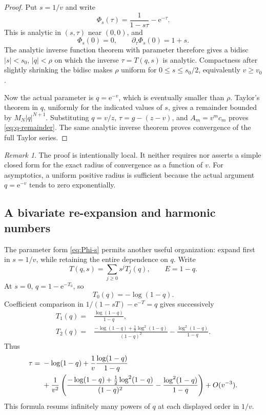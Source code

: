 \documentclass[11pt,oneside]{article}
\theoremstyle{plain}
\theoremstyle{definition}
\theoremstyle{remark}
\newtheorem{remark}[theorem]{Remark}
\newcommand{\e}{\mathrm{e}}
\begin{document}
\begin{proof}
Put \(s=1/v\) and write
\begin{equation}
 \Phi_s(\tau)=\frac1{1-s\tau}-\e^{-\tau}.
 \label{eq:Phi-s}
\end{equation}
This is analytic in \((s,\tau)\) near \((0,0)\), and
\[
 \Phi_s(0)=0,
 \qquad
 \partial_{\tau}\Phi_s(0)=1+s.
\]
The analytic inverse function theorem with parameter therefore gives a
bidisc \(|s|<s_0\), \(|q|<\rho\) on which the inverse \(\tau=T(q,s)\) is
analytic.  Compactness after slightly shrinking the bidisc makes \(\rho\)
uniform for \(0\le s\le s_0/2\), equivalently \(v\ge v_0\).

Now the actual parameter is \(q=\e^{-v}\), which is eventually smaller than
\(\rho\).  Taylor's theorem in \(q\), uniformly for the indicated values of
\(s\), gives a remainder bounded by \(M_N|q|^{N+1}\).  Substituting
\(q=v/z\), \(\tau=g-(z-v)\), and \(A_m=v^mc_m\) proves
\eqref{eq:q-remainder}.  The same analytic inverse theorem proves convergence
of the full Taylor series.
\end{proof}

\begin{remark}
The proof is intentionally local.  It neither requires nor asserts a simple
closed form for the exact radius of convergence as a function of \(v\).  For
asymptotics, a uniform positive radius is sufficient because the actual
argument \(q=\e^{-v}\) tends to zero exponentially.
\end{remark}

\subsection{A bivariate re-expansion and harmonic numbers}

The parameter form \eqref{eq:Phi-s} permits another useful organization:
expand first in \(s=1/v\), while retaining the entire dependence on
\(q\).  Write
\begin{equation}
 T(q,s)=\sum_{j\ge0}s^jT_j(q),
 \qquad E=1-q.
 \label{eq:Tjs}
\end{equation}
At \(s=0\), \(q=1-\e^{-T_0}\), so
\begin{equation}
 T_0(q)=-\log(1-q).
 \label{eq:T0}
\end{equation}
Coefficient comparison in
\(1/(1-sT)-\e^{-T}=q\) gives successively
\begin{align}
 T_1(q)={}&\frac{\log(1-q)}{1-q},
 \label{eq:T1}\\
 T_2(q)={}&
 \frac{-\log(1-q)+\tfrac12\log^2(1-q)}{(1-q)^2}
 -\frac{\log^2(1-q)}{1-q}.
 \label{eq:T2}
\end{align}
Thus
\begin{align}
 \tau={}&-\log(1-q)
 +\frac1v\frac{\log(1-q)}{1-q}\notag\\
 &+\frac1{v^2}\left(
 \frac{-\log(1-q)+\tfrac12\log^2(1-q)}{(1-q)^2}
 -\frac{\log^2(1-q)}{1-q}\right)
 +O(v^{-3}).
 \label{eq:tau-resummed}
\end{align}
This formula resums infinitely many powers of \(q\) at each displayed order in
\(1/v\).
\end{document}
